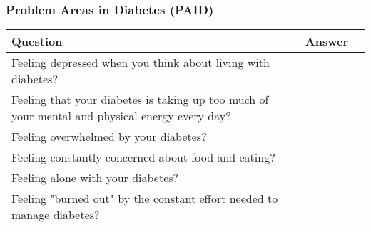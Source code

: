 \subsubsection{Problem Areas in Diabetes (PAID)}
\begin{table}[H]
    \centering
    \renewcommand{\arraystretch}{1.2}
    \begin{tabularx}{\textwidth}{|l|X|l|}
        \hline
        \textbf{Question} & \textbf{Answer} \\ \hline
        Feeling depressed when you think about living with diabetes? &  \\ \hline
        Feeling that your diabetes is taking up too much of your mental and physical energy every day? &  \\ \hline
        Feeling overwhelmed by your diabetes? &  \\ \hline
        Feeling constantly concerned about food and eating? &  \\ \hline
        Feeling alone with your diabetes? &  \\ \hline
        Feeling "burned out" by the constant effort needed to manage diabetes? &  \\ \hline
    \end{tabularx}
\end{table}
